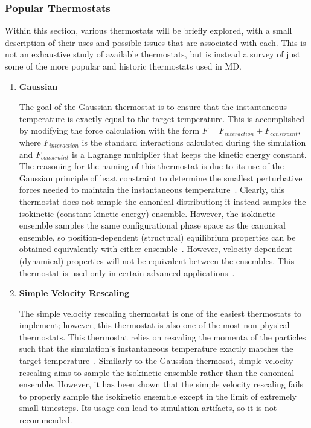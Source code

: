 \documentclass[9pt,bestpractices]{livecoms}
\begin{document}
\subsubsection{Popular Thermostats}
Within this section, various thermostats will be briefly explored, with a small description of their uses and possible issues that are associated with each.
This is not an exhaustive study of available thermostats, but is instead a survey of just some of the more popular and historic thermostats used in MD.

\begin{enumerate}[listparindent=\parindent]

    \item \textbf{Gaussian}

        The goal of the Gaussian thermostat is to ensure that the instantaneous temperature is exactly equal to the target temperature.
        This is accomplished by modifying the force calculation with the form $F = F_{interaction} + F_{constraint}$, where $F_{interaction}$ is the standard interactions calculated during the simulation and $F_{constraint}$ is a Lagrange multiplier that keeps the kinetic energy constant.
        The reasoning for the naming of this thermostat is due to its use of the Gaussian principle of least constraint to determine the smallest perturbative forces needed to maintain the instantaneous temperature~\cite{thermostatAlgorithms2005}.
        Clearly, this thermostat does not sample the canonical distribution; it instead samples the isokinetic (constant kinetic energy) ensemble.
        However, the isokinetic ensemble samples the same configurational phase space as the canonical ensemble, so position-dependent (structural) equilibrium properties can be obtained equivalently with either ensemble~\cite{Minary:2003:JChemPhysAlgorithms}.
        However, velocity-dependent (dynamical) properties will not be equivalent between the ensembles.
        This thermostat is used only in certain advanced applications~\cite{Minary:2003:JChemPhysAlgorithms}.

    \item \textbf{Simple Velocity Rescaling}

        The simple velocity rescaling thermostat is one of the easiest thermostats to implement; however, this thermostat is also one of the most non-physical thermostats.
        This thermostat relies on rescaling the momenta of the particles such that the simulation's instantaneous temperature exactly matches the target temperature~\cite{thermostatAlgorithms2005}.
        Similarly to the Gaussian thermosat, simple velocity rescaling aims to sample the isokinetic ensemble rather than the canonical ensemble.
        However, it has been shown that the simple velocity rescaling fails to properly sample the isokinetic ensemble except in the limit of extremely small timesteps\cite{Braun:2018}.
        Its usage can lead to simulation artifacts, so it is not recommended\cite{Harvey:1998:JCompChem,Braun:2018}.


\end{enumerate}
\end{document}
